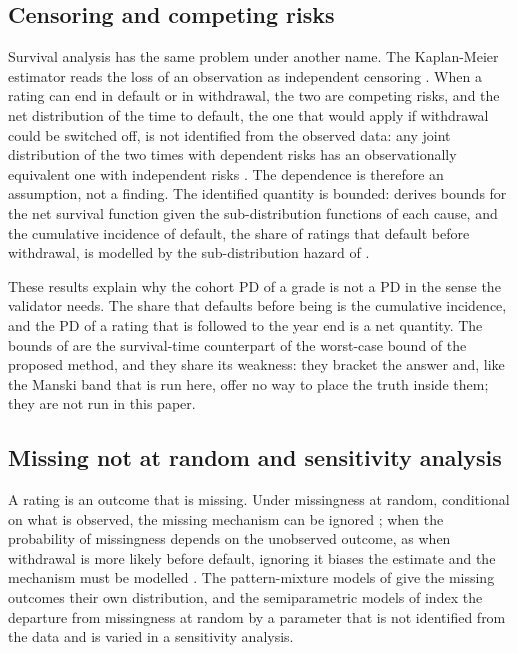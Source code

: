 \subsection{Censoring and competing risks}

Survival analysis has the same problem under another name. The Kaplan-Meier estimator reads the loss of an observation as independent censoring \citep{kaplan1958}. When a rating can end in default or in withdrawal, the two are competing risks, and the net distribution of the time to default, the one that would apply if withdrawal could be switched off, is not identified from the observed data: any joint distribution of the two times with dependent risks has an observationally equivalent one with independent risks \citep{tsiatis1975}. The dependence is therefore an assumption, not a finding. The identified quantity is bounded: \citet{peterson1976} derives bounds for the net survival function given the sub-distribution functions of each cause, and the cumulative incidence of default, the share of ratings that default before withdrawal, is modelled by the sub-distribution hazard of \citet{fine1999}.

These results explain why the cohort PD of a grade is not a PD in the sense the validator needs. The share that defaults before being \wdn{} is the cumulative incidence, and the PD of a rating that is followed to the year end is a net quantity. The bounds of \citet{peterson1976} are the survival-time counterpart of the worst-case bound of the proposed method, and they share its weakness: they bracket the answer and, like the Manski band that is run here, offer no way to place the truth inside them; they are not run in this paper.

\subsection{Missing not at random and sensitivity analysis}

A \wdn{} rating is an outcome that is missing. Under missingness at random, conditional on what is observed, the missing mechanism can be ignored \citep{rubin1976,little2019}; when the probability of missingness depends on the unobserved outcome, as when withdrawal is more likely before default, ignoring it biases the estimate and the mechanism must be modelled \citep{heckman1979}. The pattern-mixture models of \citet{little1993} give the missing outcomes their own distribution, and the semiparametric models of \citet{scharfstein1999} index the departure from missingness at random by a parameter that is not identified from the data and is varied in a sensitivity analysis.


